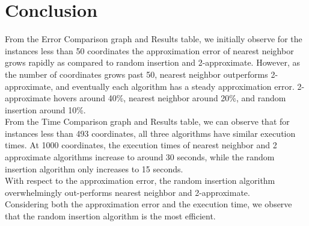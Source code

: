 \section{Conclusion}\label{conclusion}

 From the Error Comparison graph and Results table, we initially observe for the instances less than 50 coordinates the approximation error of nearest neighbor grows rapidly as compared to random insertion and 2-approximate. However, as the number of coordinates grows past 50, nearest neighbor outperforms 2-approximate, and eventually each algorithm has a steady approximation error. 2-approximate hovers around 40\%, nearest neighbor around 20\%, and random insertion around 10\%. \\
 
 From the Time Comparison graph and Results table, we can observe that for instances less than 493 coordinates, all three algorithms have similar execution times. At 1000 coordinates, the execution times of nearest neighbor and 2 approximate algorithms increase to around 30 seconds, while the random insertion algorithm only increases to 15 seconds. \\
 
With respect to the approximation error, the random insertion algorithm overwhelmingly out-performs nearest neighbor and 2-approximate.\\
 
Considering both the approximation error and the execution time, we observe that the random insertion algorithm is the most efficient. 

\pagebreak
